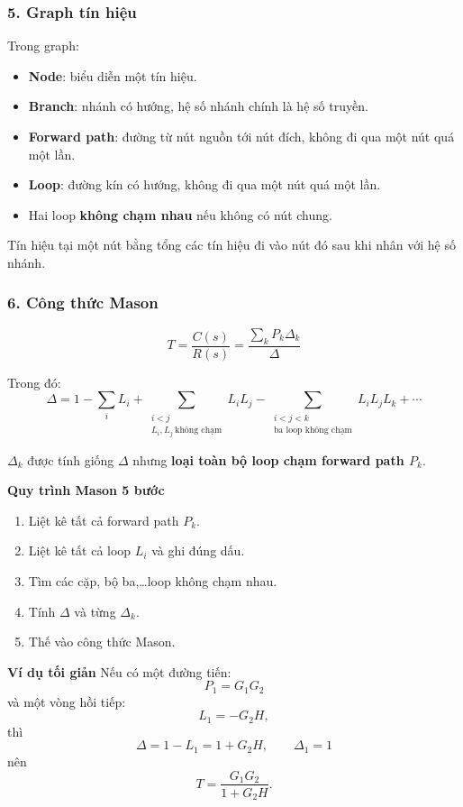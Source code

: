 \subsubsection*{5. Graph tín hiệu}

Trong graph:
\begin{itemize}
  \item \textbf{Node}: biểu diễn một tín hiệu.
  \item \textbf{Branch}: nhánh có hướng, hệ số nhánh chính là hệ số truyền.
  \item \textbf{Forward path}: đường từ nút nguồn tới nút đích, không đi qua một nút quá một lần.
  \item \textbf{Loop}: đường kín có hướng, không đi qua một nút quá một lần.
  \item Hai loop \textbf{không chạm nhau} nếu không có nút chung.
\end{itemize}

Tín hiệu tại một nút bằng tổng các tín hiệu đi vào nút đó sau khi nhân với hệ số nhánh.

\subsubsection*{6. Công thức Mason}

\[
\boxed{
T=\frac{C(s)}{R(s)}
=\frac{\sum_k P_k\Delta_k}{\Delta}
}
\]

Trong đó:
\[
\boxed{
\Delta
=
1-\sum_iL_i
+\sum_{\substack{i<j\\L_i,L_j\ \text{không chạm}}}L_iL_j
-\sum_{\substack{i<j<k\\\text{ba loop không chạm}}}L_iL_jL_k
+\cdots
}
\]

$\Delta_k$ được tính giống $\Delta$ nhưng \textbf{loại toàn bộ loop chạm forward path $P_k$}.

\textbf{Quy trình Mason 5 bước}
\begin{enumerate}
  \item Liệt kê tất cả forward path $P_k$.
  \item Liệt kê tất cả loop $L_i$ và ghi đúng dấu.
  \item Tìm các cặp, bộ ba,\ldots loop không chạm nhau.
  \item Tính $\Delta$ và từng $\Delta_k$.
  \item Thế vào công thức Mason.
\end{enumerate}

\textbf{Ví dụ tối giản}
Nếu có một đường tiến:
\[
P_1=G_1G_2
\]
và một vòng hồi tiếp:
\[
L_1=-G_2H,
\]
thì
\[
\Delta=1-L_1=1+G_2H,\qquad \Delta_1=1
\]
nên
\[
\boxed{
T=\frac{G_1G_2}{1+G_2H}.
}
\]

